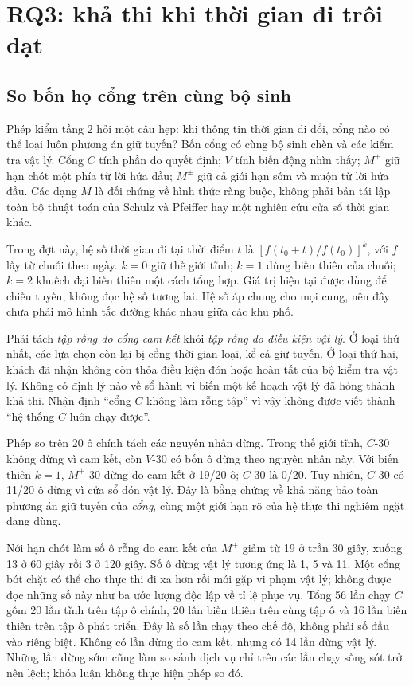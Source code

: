 \section{RQ3: khả thi khi thời gian đi trôi dạt}

\label{muc:trongdiem}

\subsection{So bốn họ cổng trên cùng bộ sinh}

Phép kiểm tầng 2 hỏi một câu hẹp: khi thông tin thời gian đi đổi, cổng nào có thể loại
luôn phương án giữ tuyến? Bốn cổng có cùng bộ sinh chèn và các kiểm tra vật lý. Cổng
$C$ tính phần do quyết định; $V$ tính biến động nhìn thấy; $M^{+}$ giữ hạn chót một
phía từ lời hứa đầu; $M^{\pm}$ giữ cả giới hạn sớm và muộn từ lời hứa đầu. Các dạng
$M$ là đối chứng về hình thức ràng buộc, không phải bản tái lập toàn bộ thuật toán
của Schulz và Pfeiffer hay một nghiên cứu cửa sổ thời gian khác.

Trong đợt này, hệ số thời gian đi tại thời điểm $t$ là
$[f(t_0+t)/f(t_0)]^k$, với $f$ lấy từ chuỗi theo ngày. $k=0$ giữ thế giới tĩnh;
$k=1$ dùng biến thiên của chuỗi; $k=2$ khuếch đại biến thiên một cách tổng hợp.
Giá trị hiện tại được dùng để chiếu tuyến, không đọc hệ số tương lai. Hệ số áp chung
cho mọi cung, nên đây chưa phải mô hình tắc đường khác nhau giữa các khu phố.

Phải tách \emph{tập rỗng do cổng cam kết} khỏi \emph{tập rỗng do điều kiện vật lý}.
Ở loại thứ nhất, các lựa chọn còn lại bị cổng thời gian loại, kể cả giữ tuyến.
Ở loại thứ hai, khách đã nhận không còn thỏa điều kiện đón hoặc hoàn tất của bộ
kiểm tra vật lý. Không có định lý nào về sổ hành vi biến một kế hoạch vật lý đã
hỏng thành khả thi. Nhận định ``cổng $C$ không làm rỗng tập'' vì vậy không được
viết thành ``hệ thống $C$ luôn chạy được''.

Phép so trên 20 ô chính tách các nguyên nhân dừng. Trong thế giới
tĩnh, $C$-30 không dừng vì cam kết, còn $V$-30 có bốn ô dừng theo nguyên nhân này.
Với biến thiên $k=1$, $M^{+}$-30 dừng do cam kết ở 19/20 ô; $C$-30 là 0/20.
Tuy nhiên, $C$-30 có 11/20 ô dừng vì cửa sổ đón vật lý. Đây là bằng chứng về
khả năng bảo toàn phương án giữ tuyến của \emph{cổng}, cùng một giới hạn rõ của
hệ thực thi nghiêm ngặt đang dùng.

Nới hạn chót làm số ô rỗng do cam kết của $M^{+}$ giảm từ 19 ở trần 30 giây,
xuống 13 ở 60 giây rồi 3 ở 120 giây. Số ô dừng vật lý tương ứng là 1, 5 và 11.
Một cổng bớt chặt có thể cho thực thi đi xa hơn rồi mới gặp vi phạm vật lý;
không được đọc những số này như ba ước lượng độc lập về tỉ lệ phục vụ.
Tổng 56 lần chạy $C$ gồm 20 lần tĩnh trên tập ô chính, 20 lần biến thiên trên cùng tập ô
và 16 lần biến thiên trên tập ô phát triển. Đây là số lần chạy theo chế độ, không phải số
đầu vào riêng biệt. Không có lần dừng do cam kết, nhưng có 14 lần dừng vật lý. Những lần dừng sớm cũng làm so sánh dịch vụ chỉ trên
các lần chạy sống sót trở nên lệch; khóa luận không thực hiện phép so đó.

